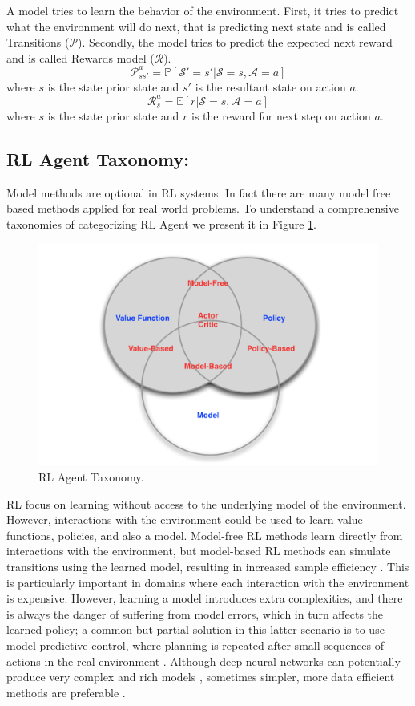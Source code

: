 A model tries to learn the behavior of the environment. First, it tries to predict what the environment will do next, that is predicting next state and is called Transitions ($\mathcal{P}$). Secondly, the model tries to predict the expected next reward and is called Rewards model ($\mathcal{R}$).
$$\mathcal{P}^a_{ss'} = \mathbb{P}[\mathcal{S}' =s'| \mathcal{S}=s, \mathcal{A} =a]$$
where $s$ is the state prior state and $s'$ is the resultant state on action $a$.
$$\mathcal{R}^a_s = \mathbb{E}[r|\mathcal{S}=s,\mathcal{A}=a]$$
where $s$ is the state prior state and $r$ is the reward for next step on action $a$.

\subsection*{RL Agent Taxonomy:}
Model methods are optional in RL systems. In fact there are many model free based methods applied for real world problems. To understand a comprehensive taxonomies of categorizing RL Agent we present it in Figure \ref{fig:taxonomy}.

\begin{figure}[t]
	\includegraphics[width=0.7\linewidth ]{fig/taxonomy.png}
    \vspace{-2mm}
    \caption{RL Agent Taxonomy.}
    \label{fig:taxonomy}
\end{figure}

RL focus on learning without access to the underlying
model of the environment. However, interactions with the
environment could be used to learn value functions, policies,
and also a model. Model-free RL methods learn directly
from interactions with the environment, but model-based RL
methods can simulate transitions using the learned model,
resulting in increased sample efficiency \cite{arulkumaran2017brief}. This is particularly
important in domains where each interaction with the environment
is expensive. However, learning a model introduces extra
complexities, and there is always the danger of suffering from
model errors, which in turn affects the learned policy; a common
but partial solution in this latter scenario is to use model
predictive control, where planning is repeated after small
sequences of actions in the real environment \cite{bertsekas2005dynamic}.
Although
deep neural networks can potentially produce very complex
and rich models \cite{oh2015action, finn2016deep}, sometimes simpler, more data efficient
methods are preferable \cite{gu2016continuous}.

